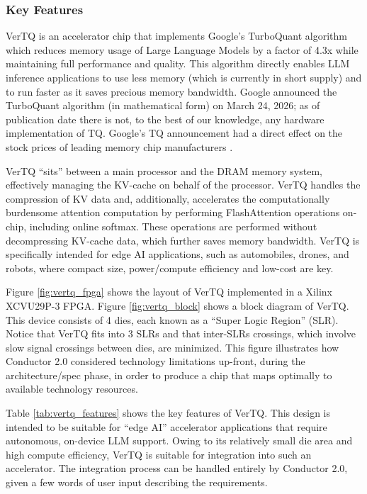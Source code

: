 \subsubsection{Key Features}

VerTQ is an accelerator chip that implements Google's TurboQuant algorithm \cite{turboquant_google_blog} which reduces memory usage of Large Language Models by a factor of 4.3x while maintaining full performance and quality. This algorithm directly enables LLM inference applications to use less memory (which is currently in short supply) and to run faster as it saves precious memory bandwidth. Google announced the TurboQuant algorithm (in mathematical form) on March 24, 2026; as of publication date there is not, to the best of our knowledge, any hardware implementation of TQ. Google's TQ announcement had a direct effect on the stock prices of leading memory chip manufacturers \cite{kharpal2026google_turboquant_memory_stocks}.

VerTQ ``sits'' between a main processor and the DRAM memory system, effectively managing the KV-cache on behalf of the processor. VerTQ handles the compression of KV data and, additionally, accelerates the computationally burdensome attention computation by performing FlashAttention \cite{dao2022flashattention}  operations on-chip, including online softmax. These operations are performed without decompressing KV-cache data, which further saves memory bandwidth. VerTQ is specifically intended for edge AI applications, such as automobiles, drones, and robots, where compact size, power/compute efficiency and low-cost are key.

Figure \ref{fig:vertq_fpga} shows the layout of VerTQ implemented in a Xilinx XCVU29P-3 FPGA. Figure \ref{fig:vertq_block} shows a block diagram of VerTQ. This device consists of 4 dies, each known as a ``Super Logic Region'' (SLR). Notice that VerTQ fits into 3 SLRs and that inter-SLRs crossings, which involve slow signal crossings between dies, are minimized. This figure illustrates how Conductor 2.0 considered technology limitations up-front, during the architecture/spec phase, in order to produce a chip that maps optimally to available technology resources.

Table \ref{tab:vertq_features} shows the key features of VerTQ. This design is intended to be suitable for ``edge AI'' accelerator applications that require autonomous, on-device LLM support. Owing to its relatively small die area and high compute efficiency, VerTQ is suitable for integration into such an accelerator. The integration process can be handled entirely by Conductor 2.0, given a few words of user input describing the requirements.

